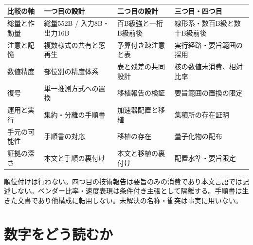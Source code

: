 \documentclass[lualatex,a4paper,10pt]{jlreq}
\begin{document}
\begin{center}
\small
\begin{tabularx}{\textwidth}{@{}p{}p{}p{}X@{}}
\toprule
比較の軸 & 一つ目の設計 & 二つ目の設計 & 三つ目・四つ目 \\
\midrule
総量と作動量 & 総量552B / 入力8B・出力16B & 百B級強と一桁B級前後 & 線形系・数百B級と数十B級前後 \\
注意と記憶 & 複数様式の共有と窓再生 & 予算付き疎注意と表 & 実行経路・要旨範囲の採用 \\
数値精度 & 部位別の精度体系 & 表と残差の共同設計 & 核の数値未消費、相対比率 \\
復号 & 単一推測方式への置換 & 移植報告の検証 & 要旨範囲の置換の限定 \\
運用と実行 & 集約・分離の手順書 & 加速器配置と移植 & 集積所の存在証明 \\
手元の可能性 & 手順書の対応 & 移植の存在 & 量子化物の配布 \\
証拠の深さ & 本文と手順の裏付け & 本文と移植の裏付け & 配置水準・要旨限定 \\
\bottomrule
\end{tabularx}
\end{center}
\autocite{v41report,qwen38next,kimigithub,glm5report}

\begin{claimboundary}[本節の読解上の境界]
順位付けは行わない。四つ目の技術報告は要旨のみの消費であり本文言語では記述しない。ベンダー比率・速度表現は条件付き主張として隔離する。手順書は生きた文書であり他構成に転用しない。未解決の名称・衝突は事実に用いない。
\end{claimboundary}

\section{数字をどう読むか}
\label{sec:measure}
\end{document}
